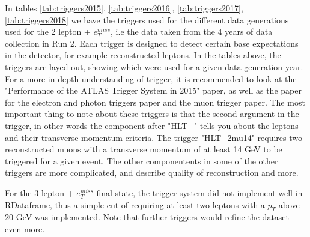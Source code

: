 In tables \ref{tab:triggers2015}, \ref{tab:triggers2016}, \ref{tab:triggers2017}, \ref{tab:triggers2018} we have the triggers used for
the different data generations used for the 2 lepton + $e_T^{miss}$, i.e the data taken from the 4 years of data collection in Run 2. 
Each trigger is designed to detect certain base expectations in the detector, for example reconstructed leptons. In the tables above,
the triggers are layed out, showing which were used for a given data generation year. For a more in depth understanding of trigger, 
it is recommended to look at the "Performance of the ATLAS Trigger System in 2015" paper\cite{triggersystem}, as well as the paper 
for the electron and photon triggers paper\cite{elec_photon} and the muon trigger paper\cite{muon}. The most important thing to note 
about these triggers is that the second argument in the trigger, in other words the component after "HLT\_" tells you about the 
leptons and their transverse momentum criteria. The trigger "HLT\_2mu14" requires two reconstructed muons with a transverse momentum 
of at least 14 GeV to be triggered for a given event. The other componentents in some of the other triggers are more complicated, and 
describe quality of reconstruction and more. \par 
For the 3 lepton + $e_T^{miss}$ final state, the trigger system did not implement well in RDataframe, thus a simple cut of requiring 
at least two leptons with a $p_T$ above 20 GeV was implemented. Note that further triggers would refine the dataset even more. 


\newpage





